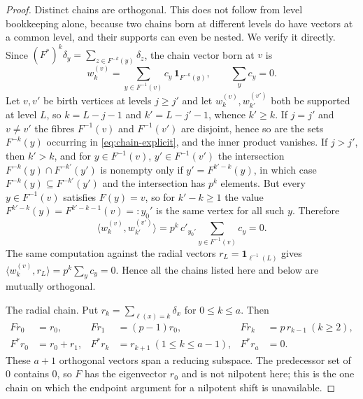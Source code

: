 \begin{proof}
Distinct chains are orthogonal.  This does not follow from level
bookkeeping alone, because two chains born at different levels do have
vectors at a common level, and their supports can even be nested.  We verify
it directly.  Since \((F^*)^k\delta_y=\sum_{z\in F^{-k}(y)}\delta_z\), the
chain vector born at \(v\) is
\begin{equation}
 w_k^{(v)}=\sum_{y\in F^{-1}(v)}c_y\,\mathbf1_{F^{-k}(y)},
 \qquad \sum_{y}c_y=0 .
 \label{eq:chain-explicit}
\end{equation}
Let \(v,v'\) be birth vertices at levels \(j\geq j'\) and let
\(w_k^{(v)},w_{k'}^{(v')}\) both be supported at level \(L\), so
\(k=L-j-1\) and \(k'=L-j'-1\), whence \(k'\geq k\).  If \(j=j'\) and
\(v\neq v'\) the fibres \(F^{-1}(v)\) and \(F^{-1}(v')\) are disjoint, hence
so are the sets \(F^{-k}(y)\) occurring in \eqref{eq:chain-explicit}, and the
inner product vanishes.  If \(j>j'\), then \(k'>k\), and for
\(y\in F^{-1}(v)\), \(y'\in F^{-1}(v')\) the intersection
\(F^{-k}(y)\cap F^{-k'}(y')\) is nonempty only if
\(y'=F^{k'-k}(y)\), in which case \(F^{-k}(y)\subseteq F^{-k'}(y')\) and the
intersection has \(p^{k}\) elements.  But every \(y\in F^{-1}(v)\) satisfies
\(F(y)=v\), so for \(k'-k\geq1\) the value
\(F^{k'-k}(y)=F^{k'-k-1}(v)=:y_0'\) is the same vertex for all such
\(y\).  Therefore
\[
 \langle w_k^{(v)},w_{k'}^{(v')}\rangle
 =p^{k}\,c'_{y_0'}\sum_{y\in F^{-1}(v)}c_y=0 .
\]
The same computation against the radial vectors \(r_L=\mathbf1_{\ell^{-1}(L)}\)
gives \(\langle w_k^{(v)},r_L\rangle=p^{k}\sum_yc_y=0\).  Hence all the chains
listed here and below are mutually orthogonal.

The radial chain.  Put \(r_k=\sum_{\ell(x)=k}\delta_x\) for
\(0\leq k\leq a\).  Then
\begin{equation}
 \begin{aligned}
 Fr_0&=r_0, & Fr_1&=(p-1)r_0, & Fr_k&=p\,r_{k-1}\ (k\geq2),\\
 F^*r_0&=r_0+r_1, & F^*r_k&=r_{k+1}\ (1\leq k\leq a-1), & F^*r_a&=0.
 \end{aligned}
 \label{eq:radial-relations}
\end{equation}
These \(a+1\) orthogonal vectors span a reducing subspace.  The predecessor
set of \(0\) contains \(0\), so \(F\) has the eigenvector \(r_0\) and is
not nilpotent here; this is the one chain on which the endpoint
argument for a nilpotent shift is unavailable.


\end{proof}
